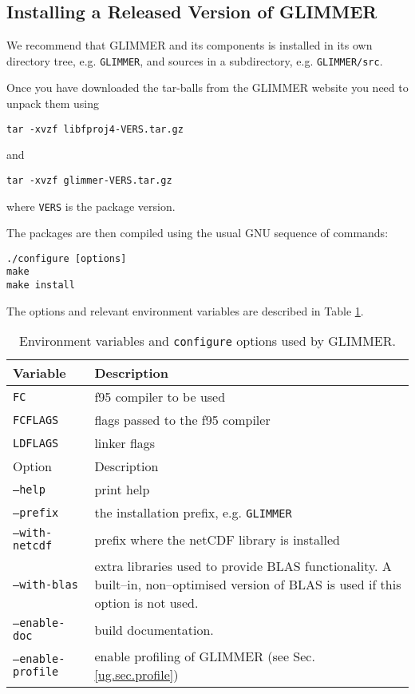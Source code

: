 \subsection{Installing a Released Version of GLIMMER}\label{ug.sec.tarball}
We recommend that GLIMMER and its components is installed in its own directory tree, e.g. \texttt{GLIMMER}, and sources in a subdirectory, e.g. \texttt{GLIMMER/src}. 

Once you have downloaded the tar-balls from the GLIMMER website you need to unpack them using
\begin{verbatim}
tar -xvzf libfproj4-VERS.tar.gz
\end{verbatim}
and
\begin{verbatim}
tar -xvzf glimmer-VERS.tar.gz
\end{verbatim}
where \texttt{VERS} is the package version.

The packages are then compiled using the usual GNU sequence of commands:
\begin{verbatim}
./configure [options]
make
make install
\end{verbatim}
The options and relevant environment variables are described in Table \ref{ug.tab.env}.
\begin{table}[htbp]
  \centering
  \begin{tabular}{|l|p{10cm}|}
    \hline
    Variable & Description \\
    \hline
    \texttt{FC} & f95 compiler to be used \\
    \texttt{FCFLAGS} & flags passed to the f95 compiler \\
    \texttt{LDFLAGS} & linker flags\\
    \hline
    Option  & Description \\
    \hline
    \texttt{--help} & print help \\
    \texttt{--prefix} & the installation prefix, e.g. \texttt{GLIMMER} \\
    \texttt{--with-netcdf} & prefix where the netCDF library is installed \\
    \texttt{--with-blas} & extra libraries used to provide BLAS functionality. A built--in, non--optimised version of BLAS is used if this option is not used. \\
    \texttt{--enable-doc} & build documentation.\\
    \texttt{--enable-profile} & enable profiling of GLIMMER (see Sec. \ref{ug.sec.profile})\\
    \hline
  \end{tabular}
  \caption{Environment variables and \texttt{configure} options used by GLIMMER.}
  \label{ug.tab.env}
\end{table}

